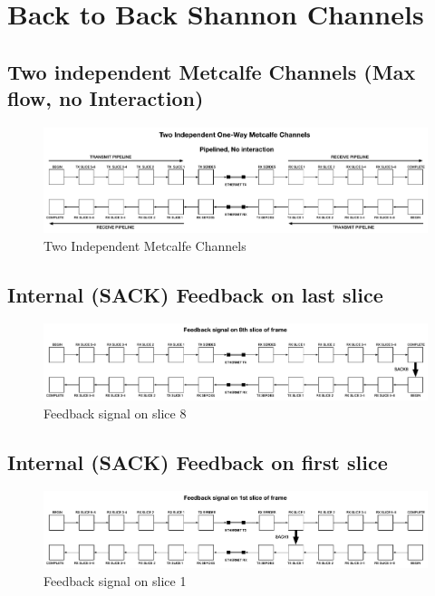 \section{Back to Back Shannon Channels}

\subsection{Two independent Metcalfe Channels (Max flow, no Interaction)}

\begin{figure}
\includegraphics[width=\textwidth]{./figures/Two-Independent-Metcalfe.pdf}
  \caption{Two Independent Metcalfe Channels}
\end{figure}

\subsection{Internal (SACK) Feedback on last slice}

\begin{figure}
\includegraphics[width=\textwidth]{./figures/feedback-slice-8.pdf}
  \caption{Feedback signal on slice 8}
\end{figure}

\subsection{Internal (SACK) Feedback on first slice}


\begin{figure}
\includegraphics[width=\textwidth]{./figures/Feedback-slice-1.pdf}
  \caption{Feedback signal on slice 1}
\end{figure}


